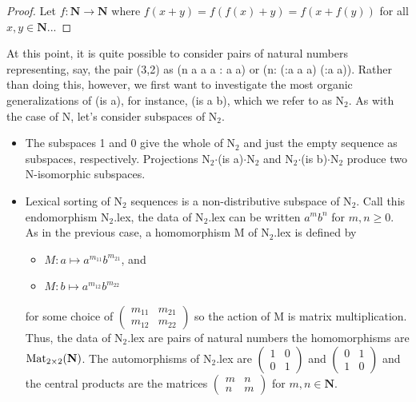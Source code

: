 \documentclass[11pt]{article}
\begin{document}
\begin{proof}
Let $f:{\mathbf N}\rightarrow{\mathbf N}$ where $f(x+y)=f(f(x)+y)=f(x+f(y))$ for all $x,y\in\mathbf N$...
\end{proof}

At this point, it is quite possible to consider pairs of natural numbers representing, say, the pair (3,2) as (n a a a : a a) or (n: (:a a a) (:a a)).  Rather than doing this, however, we 
first want to investigate the most organic generalizations of (is a), for instance, (is a b), which we refer to as N$_2$.  
As with the case of N, let's consider subspaces of N$_2$.  

\begin{itemize}
\item{The subspaces 1 and 0 give the whole of N$_2$ and just the empty sequence as subspaces, respectively.  
Projections N$_2$$\cdot$(is a)$\cdot$N$_2$ and N$_2$$\cdot$(is b)$\cdot$N$_2$ produce two N-isomorphic subspaces.}
\item{Lexical sorting of N$_2$ sequences is a non-distributive subspace of N$_2$.  Call this endomorphism N$_2$.lex, the data of N$_2$.lex 
can be written $a^m b^n$ for $m,n\ge 0$.  As in the previous case, a homomorphism M of N$_2$.lex is defined by  
\begin{itemize}
\item [] $M: a\mapsto a^{m_{11}} b^{m_{21}}$, and 
\item [] $M: b\mapsto a^{m_{12}} b^{m_{22}}$ 
\end{itemize}
for some choice of 
$
\left (
\begin{array}{cc} 
m_{11} & m_{21} \\ m_{12} & m_{22}  
\end{array}
\right ) 
$
so the action of M is matrix multiplication.  Thus, the data of N$_2$.lex are pairs of natural numbers the 
homomorphisms are ${\rm Mat}_{2\times2}(\mathbf N)$.  The automorphisms of N$_2$.lex are 
$
\left (
\begin{array}{cc} 
1 & 0 \\ 0 & 1 
\end{array}
\right ) 
$
and 
$
\left (
\begin{array}{cc} 
0 & 1 \\ 1 & 0 
\end{array}
\right ) 
$
and the central products are the matrices 
$
\left (
\begin{array}{cc} 
m & n \\ n & m 
\end{array}
\right ) 
$
for $m,n\in\mathbf N$.


}
\end{itemize}
\end{document}
